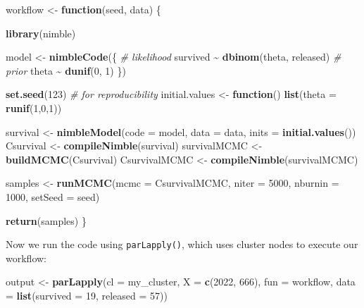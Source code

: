 \documentclass[
  12pt,
]{krantz}
\newenvironment{Shaded}{\begin{snugshade}}{\end{snugshade}}
\newcommand{\AttributeTok}[1]{\textcolor[rgb]{0.13,0.29,0.53}{#1}}
\newcommand{\CommentTok}[1]{\textcolor[rgb]{0.56,0.35,0.01}{\textit{#1}}}
\newcommand{\ControlFlowTok}[1]{\textcolor[rgb]{0.13,0.29,0.53}{\textbf{#1}}}
\newcommand{\DecValTok}[1]{\textcolor[rgb]{0.00,0.00,0.81}{#1}}
\newcommand{\FunctionTok}[1]{\textcolor[rgb]{0.13,0.29,0.53}{\textbf{#1}}}
\newcommand{\NormalTok}[1]{#1}
\newcommand{\OtherTok}[1]{\textcolor[rgb]{0.56,0.35,0.01}{#1}}
\newcommand{\SpecialCharTok}[1]{\textcolor[rgb]{0.81,0.36,0.00}{\textbf{#1}}}
\begin{document}
\begin{Shaded}
\begin{Highlighting}[]
\NormalTok{workflow }\OtherTok{\textless{}{-}} \ControlFlowTok{function}\NormalTok{(seed, data) \{}
  
  \FunctionTok{library}\NormalTok{(nimble)}
  
\NormalTok{  model }\OtherTok{\textless{}{-}} \FunctionTok{nimbleCode}\NormalTok{(\{}
    \CommentTok{\# likelihood}
\NormalTok{    survived }\SpecialCharTok{\textasciitilde{}} \FunctionTok{dbinom}\NormalTok{(theta, released)}
    \CommentTok{\# prior}
\NormalTok{    theta }\SpecialCharTok{\textasciitilde{}} \FunctionTok{dunif}\NormalTok{(}\DecValTok{0}\NormalTok{, }\DecValTok{1}\NormalTok{)}
\NormalTok{  \})}
  
  \FunctionTok{set.seed}\NormalTok{(}\DecValTok{123}\NormalTok{) }\CommentTok{\# for reproducibility}
\NormalTok{  initial.values }\OtherTok{\textless{}{-}} \ControlFlowTok{function}\NormalTok{() }\FunctionTok{list}\NormalTok{(}\AttributeTok{theta =} \FunctionTok{runif}\NormalTok{(}\DecValTok{1}\NormalTok{,}\DecValTok{0}\NormalTok{,}\DecValTok{1}\NormalTok{))}
  
\NormalTok{  survival }\OtherTok{\textless{}{-}} \FunctionTok{nimbleModel}\NormalTok{(}\AttributeTok{code =}\NormalTok{ model, }
                          \AttributeTok{data =}\NormalTok{ data, }
                          \AttributeTok{inits =} \FunctionTok{initial.values}\NormalTok{())}
\NormalTok{  Csurvival }\OtherTok{\textless{}{-}} \FunctionTok{compileNimble}\NormalTok{(survival)}
\NormalTok{  survivalMCMC }\OtherTok{\textless{}{-}} \FunctionTok{buildMCMC}\NormalTok{(Csurvival)}
\NormalTok{  CsurvivalMCMC }\OtherTok{\textless{}{-}} \FunctionTok{compileNimble}\NormalTok{(survivalMCMC)}
  
\NormalTok{  samples }\OtherTok{\textless{}{-}} \FunctionTok{runMCMC}\NormalTok{(}\AttributeTok{mcmc =}\NormalTok{ CsurvivalMCMC, }
                     \AttributeTok{niter =} \DecValTok{5000}\NormalTok{, }
                     \AttributeTok{nburnin =} \DecValTok{1000}\NormalTok{,}
                     \AttributeTok{setSeed =}\NormalTok{ seed)}
  
  \FunctionTok{return}\NormalTok{(samples)}
\NormalTok{\}}
\end{Highlighting}
\end{Shaded}

Now we run the code using \texttt{parLapply()}, which uses cluster nodes to execute our workflow:

\begin{Shaded}
\begin{Highlighting}[]
\NormalTok{output }\OtherTok{\textless{}{-}} \FunctionTok{parLapply}\NormalTok{(}\AttributeTok{cl =}\NormalTok{ my\_cluster, }
                    \AttributeTok{X =} \FunctionTok{c}\NormalTok{(}\DecValTok{2022}\NormalTok{, }\DecValTok{666}\NormalTok{),}
                    \AttributeTok{fun =}\NormalTok{ workflow, }
                    \AttributeTok{data =} \FunctionTok{list}\NormalTok{(}\AttributeTok{survived =} \DecValTok{19}\NormalTok{, }\AttributeTok{released =} \DecValTok{57}\NormalTok{))}
\end{Highlighting}
\end{Shaded}
\end{document}
